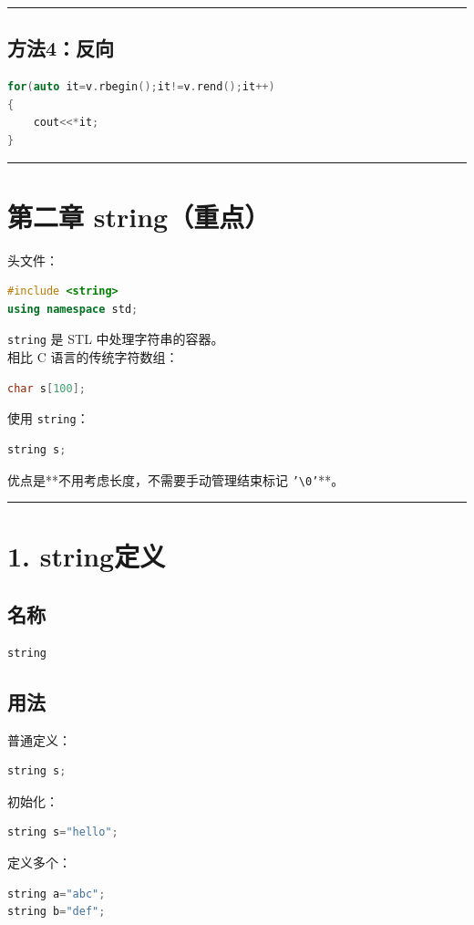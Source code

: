 \documentclass[10pt,twocolumn]{extarticle}
\begin{document}
\noindent\rule{\linewidth}{0.4pt}

\subsection{方法4：反向}
\begin{lstlisting}[language=C++]
for(auto it=v.rbegin();it!=v.rend();it++)
{
    cout<<*it;
}
\end{lstlisting}

\noindent\rule{\linewidth}{0.4pt}

\section{第二章 string（重点）}

头文件：
\begin{lstlisting}[language=C++]
#include <string>
using namespace std;
\end{lstlisting}

\texttt{string} 是 STL 中处理字符串的容器。\\
相比 C 语言的传统字符数组：
\begin{lstlisting}[language=C++]
char s[100];
\end{lstlisting}
使用 \texttt{string}：
\begin{lstlisting}[language=C++]
string s;
\end{lstlisting}
优点是**不用考虑长度，不需要手动管理结束标记 \texttt{'\textbackslash 0'}**。

\noindent\rule{\linewidth}{0.4pt}

\section{1. string定义}

\subsection{名称}
\begin{lstlisting}[language=C++]
string
\end{lstlisting}

\subsection{用法}
普通定义：
\begin{lstlisting}[language=C++]
string s;
\end{lstlisting}
初始化：
\begin{lstlisting}[language=C++]
string s="hello";
\end{lstlisting}
定义多个：
\begin{lstlisting}[language=C++]
string a="abc";
string b="def";
\end{lstlisting}
\end{document}
